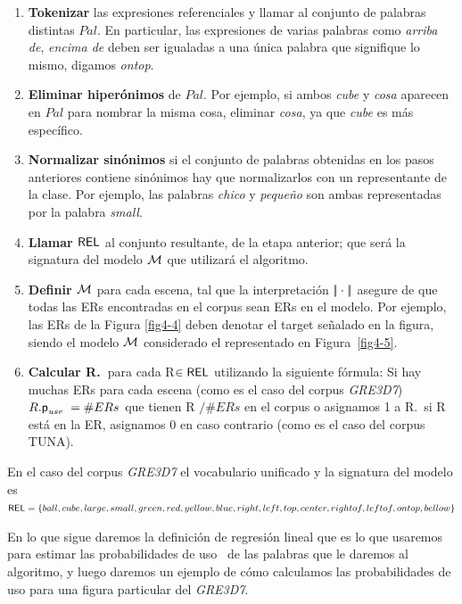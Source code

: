 \begin{enumerate}
\item \textbf{Tokenizar} las expresiones referenciales y llamar al conjunto de palabras distintas
 $Pal$. En particular, las expresiones de varias palabras como {\it arriba de}, {\it encima de}
  deben ser igualadas a una \'unica palabra que signifique lo mismo, digamos \emph{ontop}.

\item \textbf{Eliminar hiper\'onimos} de $Pal$. Por ejemplo, si ambos \emph{cube} y
  \emph{cosa} aparecen en $Pal$ para nombrar la misma cosa, eliminar \emph{cosa}, ya que \emph{cube} es m\'as espec\'ifico.

\item \textbf{Normalizar sin\'onimos} si el conjunto de palabras obtenidas en los pasos anteriores contiene
  sin\'onimos hay que normalizarlos con un representante de la clase. Por ejemplo, las palabras \emph{chico}
  y \emph{peque\~no} son ambas representadas por la palabra \emph{small}.

\item \textbf{Llamar $\textsf{REL}$} al conjunto resultante, de la etapa anterior; que ser\'a la signatura del modelo $\mathcal{M}$ que utilizar\'a el algoritmo.

\item \textbf{Definir $\mathcal{M}$} para cada escena, tal que la interpretaci\'on
 $|\!|\cdot|\!|$ asegure de que todas las ERs encontradas en el corpus sean ERs en
  el modelo. Por ejemplo, las ERs de la Figura \ref{fig4-4} deben denotar el target se\~nalado en la figura, siendo el modelo 
$\mathcal{M}$ considerado el representado en Figura~\ref{fig4-5}.
\item \textbf{Calcular R.\puse\ }para cada R$\in \textsf{REL}$ utilizando la siguiente f\'ormula: Si
  hay muchas ERs para cada escena (como es el caso del corpus \textit{GRE3D7}) $R.\textsf{p}_\textit{use}\ = \#ERs$ que tienen R $/\#ERs$ en el corpus o asignamos 1 a R.\puse \ si R est\'a en la ER, asignamos 0 en caso contrario (como es el caso del corpus TUNA).
\end{enumerate}

En el caso del corpus \textit{GRE3D7} el vocabulario unificado y la signatura del modelo es 
$\textsf{REL} = \{ball, cube, large, small, green, red, yellow, blue, right, left, top, center, rightof, leftof, ontop,\\ 
bellow\} $

En lo que sigue daremos la definici\'on de regresi\'on lineal que es lo que usaremos para estimar las probabilidades de uso \puse\ de las palabras que le daremos al algoritmo, y luego daremos un ejemplo de c\'omo calculamos las probabilidades de uso para una figura particular del \textit{GRE3D7}.

